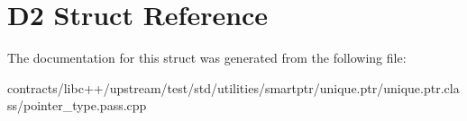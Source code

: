 \hypertarget{struct_d2}{}\section{D2 Struct Reference}
\label{struct_d2}


The documentation for this struct was generated from the following file\+:\begin{DoxyCompactItemize}
\item 
contracts/libc++/upstream/test/std/utilities/smartptr/unique.\+ptr/unique.\+ptr.\+class/pointer\+\_\+type.\+pass.\+cpp\end{DoxyCompactItemize}
